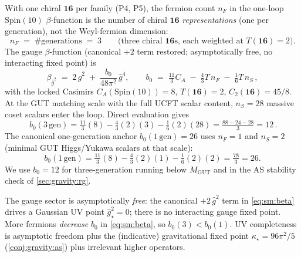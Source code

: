\begin{theorem}\label{thm:sm:b0}
\label{thm:gravity:beta}
With one chiral $\mathbf{16}$ per family (P4, P5), the fermion count $n_F$ in the
one-loop $\mathrm{Spin}(10)$ $\beta$-function is the number of chiral
$\mathbf{16}$ \emph{representations} (one per generation), not the Weyl-fermion
dimension:
\begin{equation}\label{eq:sm:nF}
n_F \;=\; \#\text{generations} \;=\; 3
\qquad\text{(three chiral $\mathbf{16}$s, each weighted at $T(\mathbf{16})=2$).}
\end{equation}
The gauge $\beta$-function (canonical $+2$ term restored; asymptotically free, no
interacting fixed point) is
\begin{equation}\label{eq:sm:beta}
\beta_{\hat g^{2}} \;=\; 2\,\hat g^{2} \;+\; \frac{b_0}{48\pi^2}\,\hat g^{4},
\qquad
b_0 \;=\; \tfrac{11}{3}C_A \;-\; \tfrac{4}{3}T\,n_F \;-\; \tfrac{1}{6}T\,n_S\,,
\end{equation}
with the locked Casimirs $C_A(\mathrm{Spin}(10))=8$, $T(\mathbf{16})=2$,
$C_2(\mathbf{16})=45/8$. At the GUT matching scale with the full UCFT scalar
content, $n_S=28$ massive coset scalars enter the loop. Direct evaluation gives
\begin{equation}\label{eq:sm:b0three}
\boxed{\,
b_0(3\,\mathrm{gen})
=\tfrac{11}{3}(8)-\tfrac{4}{3}(2)(3)-\tfrac{1}{6}(2)(28)
=\tfrac{88-24-28}{3}=12\,.}
\end{equation}
The canonical one-generation anchor $b_0(1\,\mathrm{gen})=26$ uses $n_F=1$ and
$n_S=2$ (minimal GUT Higgs/Yukawa scalars at that scale):
\begin{equation}\label{eq:sm:b0one}
b_0(1\,\mathrm{gen})
=\tfrac{11}{3}(8)-\tfrac{4}{3}(2)(1)-\tfrac{1}{6}(2)(2)=\tfrac{78}{3}=26.
\end{equation}
We use $b_0=12$ for three-generation running below $M_{\mathrm{GUT}}$ and in the
AS stability check of \autoref{sec:gravity:rg}.
\end{theorem}

\begin{remark}
The gauge sector is asymptotically \emph{free}: the canonical $+2\,\hat g^{2}$
term in \eqref{eq:sm:beta} drives a Gaussian UV point $\hat g^{2}_\star=0$; there
is no interacting gauge fixed point. More fermions \emph{decrease} $b_0$ in
\eqref{eq:sm:beta}, so $b_0(3)<b_0(1)$. UV completeness is asymptotic freedom
plus the (indicative) gravitational fixed point $\kappa_\star=96\pi^2/5$
(\autoref{conj:gravity:as}) plus irrelevant higher operators.
\end{remark}

